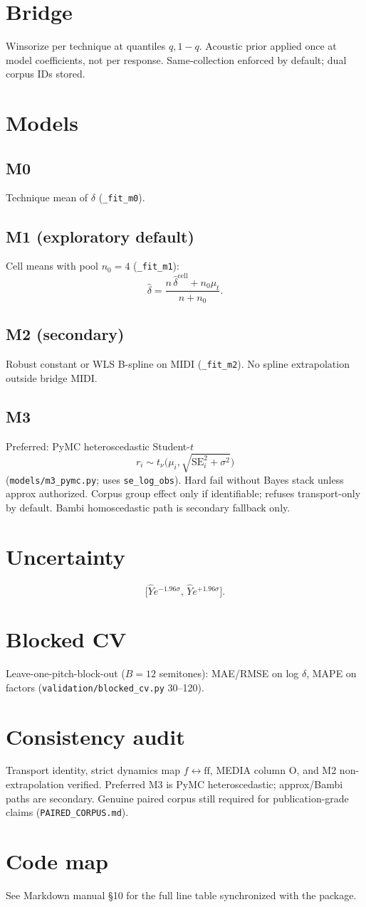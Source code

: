 \documentclass[11pt,a4paper]{article}
\begin{document}
\section{Bridge}
Winsorize per technique at quantiles $q,1-q$. Acoustic prior applied
once at model coefficients, not per response.
Same-collection enforced by default; dual corpus IDs stored.

\section{Models}
\subsection{M0} Technique mean of $\delta$ (\texttt{\_fit\_m0}).
\subsection{M1 (exploratory default)} Cell means with pool $n_0=4$ (\texttt{\_fit\_m1}):
\[
\widehat\delta=\frac{n\,\widehat\delta^{\mathrm{cell}}+n_0\mu_t}{n+n_0}.
\]
\subsection{M2 (secondary)} Robust constant or WLS B-spline on MIDI
(\texttt{\_fit\_m2}). No spline extrapolation outside bridge MIDI.
\subsection{M3} Preferred: PyMC heteroscedastic Student-$t$
\[
r_i\sim t_\nu\!\bigl(\mu_i,\sqrt{\mathrm{SE}_i^2+\sigma^2}\bigr)
\]
(\texttt{models/m3\_pymc.py}; uses \texttt{se\_log\_obs}).
Hard fail without Bayes stack unless approx authorized.
Corpus group effect only if identifiable; refuses transport-only by default.
Bambi homoscedastic path is secondary fallback only.

\section{Uncertainty}
\[
\big[\widehat Y e^{-1.96\sigma},\,\widehat Y e^{+1.96\sigma}\big].
\]
\section{Blocked CV}
Leave-one-pitch-block-out ($B=12$ semitones): MAE/RMSE on log $\delta$, MAPE on factors
(\texttt{validation/blocked\_cv.py} 30--120).

\section{Consistency audit}
Transport identity, strict dynamics map $f\leftrightarrow\mathrm{ff}$, MEDIA column O,
and M2 non-extrapolation verified. Preferred M3 is PyMC heteroscedastic;
approx/Bambi paths are secondary. Genuine paired corpus still required
for publication-grade claims (\texttt{PAIRED\_CORPUS.md}).

\section{Code map}
See Markdown manual §10 for the full line table synchronized with the package.
\end{document}
